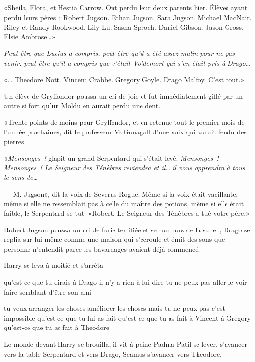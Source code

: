 «Sheila, Flora, et Hestia Carrow. Ont perdu leur deux parents hier. Élèves ayant perdu leurs pères~: Robert Jugson. Ethan Jugson. Sara Jugson. Michael MacNair. Riley et Randy Rookwood. Lily Lu. Sasha Sproch. Daniel Gibson. Jason Gross. Elsie Ambrose…»

\emph{Peut-être que Lucius a compris, peut-être qu'il a été assez malin pour ne pas venir, peut-être qu'il a compris que c'était Voldemort qui s'en était pris à Drago…}

«… Theodore Nott. Vincent Crabbe. Gregory Goyle. Drago Malfoy. C'est tout.»

Un élève de Gryffondor poussa un cri de joie et fut immédiatement giflé par un autre si fort qu'un Moldu en aurait perdu une dent.

«Trente points de moins pour Gryffondor, et en retenue tout le premier mois de l'année prochaine», dit le professeur McGonagall d'une voix qui aurait fendu des pierres.

«\emph{Mensonges~!} glapit un grand Serpentard qui s'était levé. \emph{Mensonges~! Mensonges~! Le Seigneur des Ténèbres reviendra et il… il vous apprendra à tous le sens de…}

--- M. Jugson», dit la voix de Severus Rogue. Même si la voix était vacillante, même si elle ne ressemblait pas à celle du maître des potions, même si elle était faible, le Serpentard se tut. «Robert. Le Seigneur des Ténèbres a tué votre père.»

Robert Jugson poussa un cri de furie terrifiée et se rua hors de la salle~; Drago se replia sur lui-même comme une maison qui s'écroule et émit des sons que personne n'entendit parce les bavardages avaient déjà commencé.

Harry se leva à moitié et s'arrêta

qu'est-ce que tu dirais à Drago il n'y a rien à lui dire tu ne peux pas aller le voir faire semblant d'être son ami

tu veux arranger les choses améliorer les choses mais tu ne peux pas c'est impossible qu'est-ce que tu lui as fait qu'est-ce que tu as fait à Vincent à Gregory qu'est-ce que tu as fait à Theodore

Le monde devant Harry se brouilla, il vit à peine Padma Patil se lever, s'avancer vers la table Serpentard et vers Drago, Seamus s'avancer vers Theodore.


